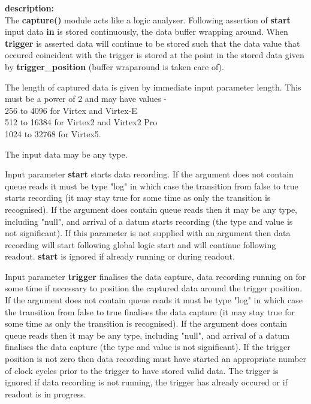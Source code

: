             {\bf description:} \\
            The {\bf capture()} module acts like a logic analyser. Following
            assertion of {\bf start} input data {\bf in} is stored continuously,
            the data buffer wrapping around. When {\bf trigger} is asserted data
            will continue to be stored such that the data value that occured
            coincident with the trigger is stored at the point in the stored
            data given by {\bf trigger\_position} (buffer wraparound is taken
            care of).

            The length of captured data is given by immediate input parameter
            length. This must be a power of 2 and may have values -\\
            256 to 4096 for Virtex and Virtex-E\\
            512 to 16384 for Virtex2 and Virtex2 Pro\\
            1024 to 32768 for Virtex5.

            The input data may be any type.

            Input parameter {\bf start} starts data recording. If the argument
            does not contain queue reads it must be type "log" in which case the
            transition from false to true starts recording (it may stay true for
            some time as only the transition is recognised). If the argument
            does contain queue reads then it may be any type, including "null",
            and arrival of a datum starts recording (the type and value is not
            significant). If this parameter is not supplied with an argument
            then data recording will start following global logic start and will
            continue following readout. {\bf start} is ignored if already
            running or during readout.

            Input parameter {\bf trigger} finalises the data capture, data
            recording running on for some time if necessary to position the
            captured data around the trigger position. If the argument does not
            contain queue reads it must be type "log" in which case the
            transition from false to true finalises the data capture (it may
            stay true for some time as only the transition is recognised). If
            the argument does contain queue reads then it may be any type,
            including "null", and arrival of a datum finalises the data capture
            (the type and value is not significant). If the trigger position is
            not zero then data recording must have started an appropriate number
            of clock cycles prior to the trigger to have stored valid data. The
            trigger is ignored if data recording is not running, the trigger has
            already occured or if readout is in progress.

